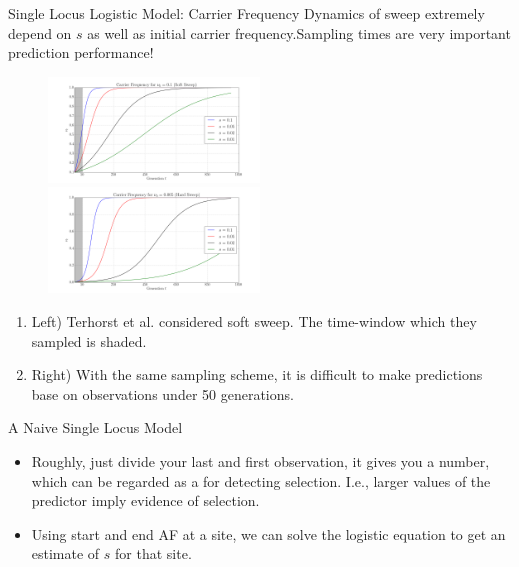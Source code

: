 \documentclass[t]{beamer} %
\begin{document}
\begin{frame}{Single Locus Logistic Model: Carrier Frequency}
Dynamics of sweep extremely depend on $s$ as well as initial carrier frequency.Sampling times are very important prediction performance!

\begin{figure}
\centering
\hspace{-0in}\includegraphics[trim={2in 0.5in 1.5in 0in},clip,page=2,width=0.5\textwidth]{sigmoidSoft}
\hspace{-0in}\includegraphics[trim={2in 0.5in 1.9in 0in},clip,page=2,width=0.5\textwidth]{sigmoidHard}
\end{figure}
{\tiny
\begin{enumerate}
\item Left) Terhorst et al. considered soft sweep. The time-window which  they sampled is shaded. 
\item Right) With the same sampling scheme, it is difficult to make predictions base on observations under 50 generations.
\end{enumerate}
}
\end{frame}

\begin{frame}{A Naive Single Locus Model}
\begin{itemize}
\item Roughly, just divide your last and first observation, it gives you a number, which can be regarded as a  for detecting selection. I.e., larger values of the predictor imply evidence of selection.
\item Using start and end AF at a site, we can solve the logistic equation to get an estimate of $s$ for that site.
\end{itemize}

\end{frame}
\end{document}
